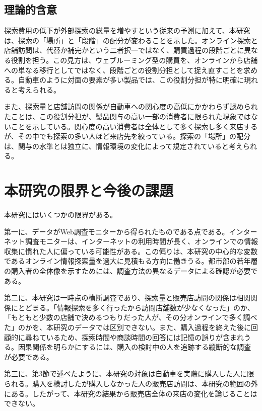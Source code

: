 \subsection{理論的含意}

探索費用の低下が外部探索の総量を増やすという従来の予測に加えて、本研究は、探索の「場所」と「段階」の配分が変わることを示した。オンライン探索と店舗訪問は、代替か補完かという二者択一ではなく、購買過程の段階ごとに異なる役割を担う。この見方は、ウェブルーミング型の購買を、オンラインから店舗への単なる移行としてではなく、段階ごとの役割分担として捉え直すことを求める。自動車のように対面の要素が多い製品では、この役割分担が特に明確に現れると考えられる。

また、探索量と店舗訪問の関係が自動車への関心度の高低にかかわらず認められたことは、この役割分担が、製品関与の高い一部の消費者に限られた現象ではないことを示している。関心度の高い消費者は全体として多く探索し多く来店するが、その中でも探索の多い人ほど来店先を絞っている。探索の「場所」の配分は、関与の水準とは独立に、情報環境の変化によって規定されていると考えられる。

\newpage
\section{本研究の限界と今後の課題}

本研究にはいくつかの限界がある。

第一に、データがWeb調査モニターから得られたものである点である。インターネット調査モニターは、インターネットの利用時間が長く、オンラインでの情報収集に慣れた人に偏っている可能性がある。この偏りは、本研究の中心的な変数であるオンライン情報探索量を過大に見積もる方向に働きうる。都市部の若年層の購入者の全体像を示すためには、調査方法の異なるデータによる確認が必要である。

第二に、本研究は一時点の横断調査であり、探索量と販売店訪問の関係は相関関係にとどまる。「情報探索を多く行ったから訪問店舗数が少なくなった」のか、「もともと少数の店舗で決めるつもりだった人が、その分オンラインで多く調べた」のかを、本研究のデータでは区別できない。また、購入過程を終えた後に回顧的に尋ねているため、探索時間や商談時間の回答には記憶の誤りが含まれうる。因果関係を明らかにするには、購入の検討中の人を追跡する縦断的な調査が必要である。

第三に、第3節で述べたように、本研究の対象は自動車を実際に購入した人に限られる。購入を検討したが購入しなかった人の販売店訪問は、本研究の範囲の外にある。したがって、本研究の結果から販売店全体の来店の変化を論じることはできない。

